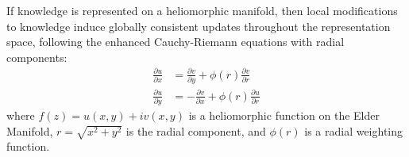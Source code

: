 \begin{theorem}
If knowledge is represented on a heliomorphic manifold, then local modifications to knowledge induce globally consistent updates throughout the representation space, following the enhanced Cauchy-Riemann equations with radial components:
\begin{align}
\frac{\partial u}{\partial x} &= \frac{\partial v}{\partial y} + \phi(r)\frac{\partial v}{\partial r} \\
\frac{\partial u}{\partial y} &= -\frac{\partial v}{\partial x} + \phi(r)\frac{\partial u}{\partial r}
\end{align}
where $f(z) = u(x,y) + iv(x,y)$ is a heliomorphic function on the Elder Manifold, $r = \sqrt{x^2 + y^2}$ is the radial component, and $\phi(r)$ is a radial weighting function.
\end{theorem}

